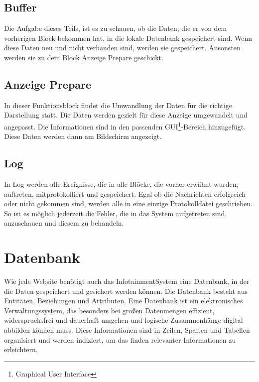 \subsection{Buffer}
Die Aufgabe dieses Teils, ist es zu schauen, ob die Daten, die er von dem vorherigen Block bekommen hat, in die lokale Datenbank gespeichert sind. Wenn diese Daten neu und nicht verhanden sind, werden sie gespeichert. Ansonsten werden sie zu dem Block Anzeige Prepare geschickt.

\subsection{Anzeige Prepare}
In dieser Funktionsblock findet die Umwandlung der Daten für die richtige Darstellung statt. Die Daten werden gezielt für diese Anzeige umgewandelt und angepasst. Die Informationen sind in den passenden GUI\footnote{Graphical User Interface}-Bereich hinzugefügt. Diese Daten werden dann am Bildschirm angezeigt.

\subsection{Log}
In Log werden alle Ereignisse, die in alle Blöcke, die vorher erwähnt wurden, auftreten, mitprotokolliert und gespeichert.  Egal ob die Nachrichten erfolgreich oder nicht gekommen sind, werden alle in eine einzige Protokolldatei geschrieben. So ist es möglich jederzeit die Fehler, die in das System aufgetreten sind, anzuschauen und diesem zu behandeln.

\section{Datenbank}
Wie jede Website benötigt auch das InfotainmentSystem eine Datenbank, in der die Daten gespeichert und gesichert werden können. Die Datenbank besteht aus Entitäten, Beziehungen und Attributen. Eine Datenbank ist ein elektronisches Verwaltungssystem, das besonders bei großen Datenmengen effizient, widerspruchsfrei und dauerhaft umgehen und logische Zusammenhänge digital abbilden können muss. Diese Informationen sind in Zeilen, Spalten und Tabellen organisiert und werden indiziert, um das finden relevanter Informationen zu erleichtern.

